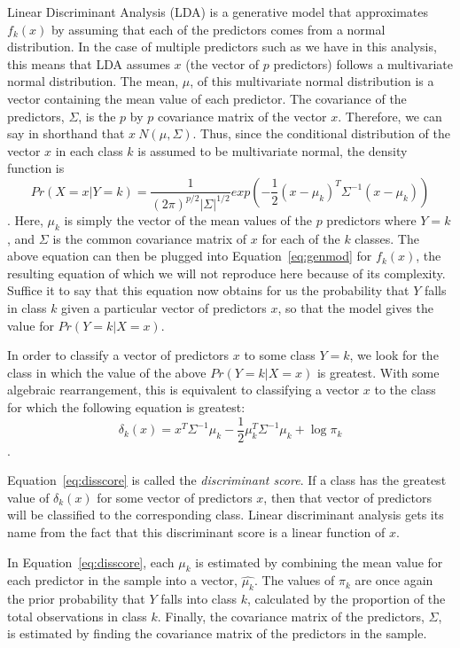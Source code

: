 \documentclass[12pt]{article}
\begin{document}
Linear Discriminant Analysis (LDA) is a generative model that approximates $f_k(x)$ by 
assuming that each of the predictors comes from a normal distribution.  In the case of 
multiple predictors such as we have in this analysis, this means that LDA assumes $x$ 
(the vector of $p$ predictors) follows a multivariate normal distribution.  The mean, 
$\mu$, of this multivariate normal distribution is a vector containing the mean value 
of each predictor.  The covariance of the predictors, $\Sigma$, is the $p$ by $p$ 
covariance matrix of the vector $x$.  Therefore, we can say in shorthand that 
$x ~ N(\mu,\Sigma)$.  Thus, since the conditional distribution of the vector $x$ in 
each class $k$ is assumed to be multivariate normal, the density function is 
$$Pr(X = x|Y = k) = \frac {1} {(2\pi) ^ {p/2} |\Sigma| ^ 
{1/2}} exp(-\frac{1}{2}   (x - \mu_k) ^ T \Sigma ^ {-1} (x - \mu_k))$$.  
Here, $\mu_k$ is simply the vector of the mean values of the $p$ predictors where 
$Y = k$, and $\Sigma$ is the common covariance matrix of $x$ for each of the $k$ 
classes.  The above equation can then be plugged into Equation~\eqref{eq:genmod} 
for $f_k(x)$, the resulting equation of which we will not reproduce here because of 
its complexity.  Suffice it to say that this equation now obtains for us the probability 
that $Y$ falls in class $k$ given a particular vector of predictors $x$, so that the 
model gives the value for $Pr(Y = k|X = x)$.

In order to classify a vector of predictors $x$ to some class $Y = k$, we look for the 
class in which the value of the above $Pr(Y = k|X = x)$ is greatest.  With some 
algebraic rearrangement, this is equivalent to classifying a vector $x$ to the 
class for which the following equation is greatest:
\begin{equation}
  \label{eq:disscore}
  \delta_k(x) = x ^ T \Sigma ^ {-1} \mu_k - 
  \frac {1} {2} \mu_k ^ T \Sigma ^ {-1} \mu_k + \log {\pi_k}
\end{equation}. 

Equation~\eqref{eq:disscore} is called the \textit{discriminant score}.  If a class 
has the greatest value of $\delta_k(x)$ for some vector of predictors $x$, then that 
vector of predictors will be classified to the corresponding class. Linear 
discriminant analysis gets its name from the fact that this discriminant score is a 
linear function of $x$. 

In Equation~\eqref{eq:disscore}, each $\mu_k$ is estimated by combining the mean value 
for each predictor in the sample into a vector, $\hat{\mu_k}$.  The values of $\pi_k$ 
are once again the prior probability that $Y$ falls into class $k$, calculated by the 
proportion of the total observations in class $k$.  Finally, the covariance matrix of 
the predictors, $\Sigma$, is estimated by finding the covariance matrix of the 
predictors in the sample. 
\end{document}
